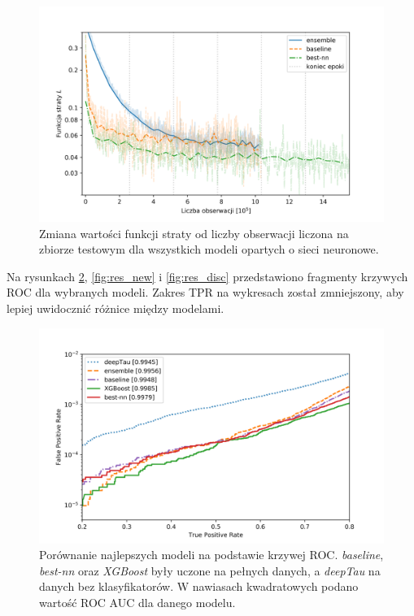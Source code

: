 \documentclass{pracalicmgr}
\begin{document}
	\begin{figure}
	\centering
	\includegraphics[width=1.\textwidth]{loss_all.png}
	\caption{Zmiana wartości funkcji straty od liczby obserwacji liczona na zbiorze testowym dla wszystkich modeli opartych o sieci neuronowe.}
	\label{fig:loss_all}
	\end{figure}	
	
	Na rysunkach \ref{fig:res_best}, \ref{fig:res_new} i \ref{fig:res_disc} przedstawiono fragmenty krzywych ROC dla wybranych modeli. Zakres TPR na wykresach został zmniejszony, aby lepiej uwidocznić różnice między modelami.
	
	\begin{figure}
	\centering
	\includegraphics[width=1\textwidth]{best_models.png}
	\caption{Porównanie najlepszych modeli na podstawie krzywej ROC.  \textit{baseline}, \textit{best-nn} oraz \textit{XGBoost} były uczone na pełnych danych, a \textit{deepTau} na danych bez klasyfikatorów. W nawiasach kwadratowych podano wartość ROC AUC dla danego modelu.}
	\label{fig:res_best}	
	\end{figure}
	
\end{document}
